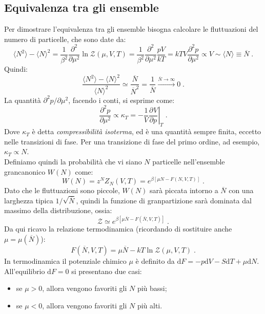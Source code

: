 \documentclass[10pt,a4paper]{report}
\theoremstyle{definition}
\newcommand{\pdev}[3][]{\frac{\partial^{#1} #2}{\partial #3^{#1}}}
\numberwithin{equation}{section}
\newcommand{\diff}[1][]{\mathrm{d}#1}
\newcommand{\bra}{\langle}
\newcommand{\ket}{\rangle}
\newcommand{\zpart}{\mathcal{Z}}
\begin{document}
\subsection{Equivalenza tra gli ensemble}
Per dimostrare l'equivalenza tra gli ensemble bisogna calcolare le fluttuazioni del numero di particelle, che sono date da:
\begin{equation}
\bra N^2\ket -\bra N\ket^2=\frac{1}{\beta^2}\frac{\partial^2}{\partial \mu^2}\ln \zpart(\mu,V,T)=\frac{1}{\beta^2}\frac{\partial^2}{\partial\mu^2}\frac{pV}{kT}=kTV\pdev[2]{p}{\mu}\propto V\sim \bra N\ket\equiv\overline{N}\;.
\end{equation}
Quindi:
\begin{equation}
\frac{\bra N^2\ket -\bra N\ket^2}{\bra N\ket^2}\simeq \frac{\overline{N}}{\overline{N}^2}=\frac{1}{\overline{N}}\stackrel{\overline{N}\to\infty}{\longrightarrow} 0\;.
\end{equation}
La quantità $\partial^2 p/\partial\mu^2$, facendo i conti, si esprime come:
\begin{equation}
\pdev[2]{p}{\mu}\propto \kappa_T=-\frac{1}{V}\left.\pdev{V}{p}\right|_T\;.
\end{equation}
Dove $\kappa_T$ è detta \emph{compressibilità isoterma}, ed è una quantità sempre finita, eccetto nelle transizioni di fase. Per una transizione di fase del primo ordine, ad esempio, $\kappa_T\propto N$. \\
Definiamo quindi la probabilità che vi siano $N$ particelle nell'ensemble grancanonico $W(N)$ come:
\begin{equation}
W(N)=z^NZ_N(V,T)=e^{\beta[\mu N-F(N,V,T)]}\;.
\end{equation}
Dato che le fluttuazioni sono piccole, $W(N)$ sarà piccata intorno a $\overline{N}$ con una larghezza tipica $1/\sqrt{\overline{N}}$, quindi la funzione di granpartizione sarà dominata dal massimo della distribuzione, ossia:
$$
\zpart\simeq e^{\beta[\mu\overline{N}-F(\overline{N},V,T)]}\;.
$$
Da qui ricavo la relazione termodinamica (ricordando di sostituire anche $\mu=\mu(\overline{N})$):
\begin{equation}
F(\overline{N},V,T)=\mu\overline{N}-kT\ln\zpart(\mu,V,T)\;.
\end{equation}
In termodinamica il potenziale chimico $\mu$ è definito da $\diff{F}=-p\diff{V}-S\diff{T}+\mu\diff{N}$. All'equilibrio $\diff{F}=0$ si presentano due casi:
\begin{itemize}
\item se $\mu>0$, allora vengono favoriti gli $N$ più bassi;
\item se $\mu<0$, allora vengono favoriti gli $N$ più alti.
\end{itemize}
\end{document}
